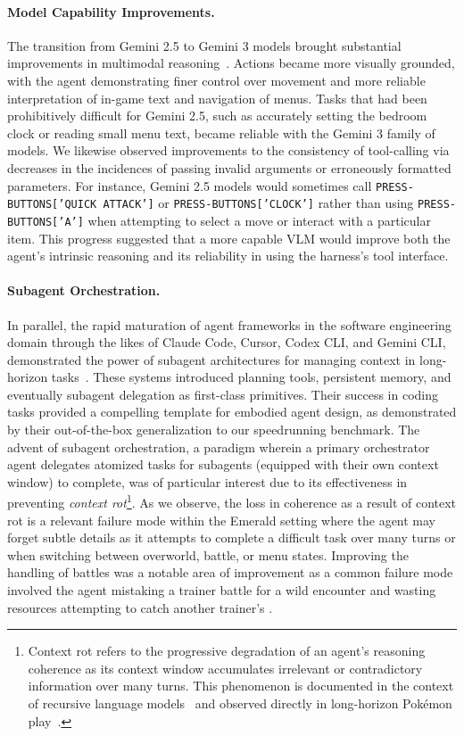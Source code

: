 \paragraph{Model Capability Improvements.} The transition from Gemini 2.5 to Gemini 3 models brought substantial improvements in multimodal reasoning~\citep{google2025gemini3}. Actions became more visually grounded, with the agent demonstrating finer control over movement and more reliable interpretation of in-game text and navigation of menus. Tasks that had been prohibitively difficult for Gemini 2.5, such as accurately setting the bedroom clock or reading small menu text, became reliable with the Gemini 3 family of models. We likewise observed improvements to the consistency of tool-calling via decreases in the incidences of  passing invalid arguments or erroneously formatted parameters. For instance, Gemini 2.5 models would sometimes call \texttt{PRESS-BUTTONS['QUICK ATTACK']} or \texttt{PRESS-BUTTONS['CLOCK']} rather than using \texttt{PRESS-BUTTONS['A']} when attempting to select a move or interact with a particular item. This progress suggested that a more capable VLM would improve both the agent's intrinsic reasoning and its reliability in using the harness's tool interface.


\paragraph{Subagent Orchestration.} In parallel, the rapid maturation of agent frameworks in the software engineering domain through the likes of Claude Code, Cursor, Codex CLI, and Gemini CLI, demonstrated the power of subagent architectures for managing context in long-horizon tasks~\citep{cursor2026scalingagents}. These systems introduced planning tools, persistent memory, and eventually subagent delegation as first-class primitives. Their success in coding tasks provided a compelling template for embodied agent design, as demonstrated by their out-of-the-box generalization to our speedrunning benchmark. The advent of subagent orchestration, a paradigm wherein a primary orchestrator agent delegates atomized tasks for subagents (equipped with their own context window) to complete, was of particular interest due to its effectiveness in preventing \textit{context rot}\footnote{Context rot refers to the progressive degradation of an agent's reasoning coherence as its context window accumulates irrelevant or contradictory information over many turns. This phenomenon is documented in the context of recursive language models~\citep{zhang2025rlm} and observed directly in long-horizon Pok\'{e}mon play~\citep{gemini2p5report}.}. As we observe, the loss in coherence as a result of context rot is a relevant failure mode within the \pokemon{} Emerald setting where the agent may forget subtle details as it attempts to complete a difficult task over many turns or when switching between overworld, battle, or menu states. Improving the handling of battles was a notable area of improvement as a common failure mode involved the agent mistaking a trainer battle for a wild encounter and wasting resources attempting to catch another trainer's \pokemon{}.

